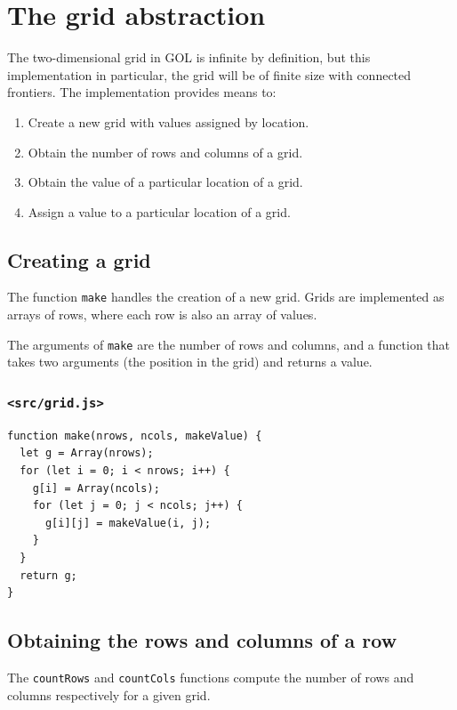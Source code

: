 \documentclass[11pt]{article}
\begin{document}
\section{The grid abstraction}
\label{sec:org57c5c10}

The two-dimensional grid in GOL is infinite by definition, but this implementation in particular, the grid will be of finite size with connected frontiers. The implementation provides means to:
\begin{enumerate}
\item Create a new grid with values assigned by location.
\item Obtain the number of rows and columns of a grid.
\item Obtain the value of a particular location of a grid.
\item Assign a value to a particular location of a grid.
\end{enumerate}

\subsection{Creating a grid}
\label{sec:org02e14e2}

The function \texttt{make} handles the creation of a new grid. Grids are implemented as arrays of rows, where each row is also an array of values.

The arguments of \texttt{make} are the number of rows and columns, and a function that takes two arguments (the position in the grid) and returns a value.

\subsubsection{\texttt{<src/grid.js>}}
\label{sec:orgd148605}
\begin{verbatim}
function make(nrows, ncols, makeValue) {
  let g = Array(nrows);
  for (let i = 0; i < nrows; i++) {
    g[i] = Array(ncols);
    for (let j = 0; j < ncols; j++) {
      g[i][j] = makeValue(i, j);
    }
  }
  return g;
}
\end{verbatim}

\subsection{Obtaining the rows and columns of a row}
\label{sec:org33a51aa}

The \texttt{countRows} and \texttt{countCols} functions compute the number of rows and columns respectively for a given grid.
\end{document}
